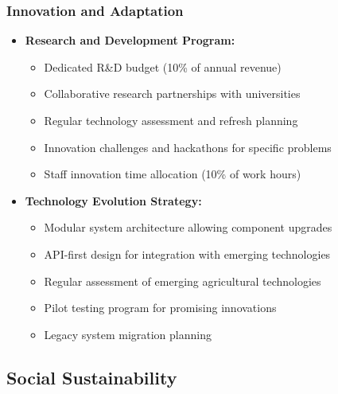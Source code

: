 \subsubsection{Innovation and Adaptation}
\begin{itemize}
    \item \textbf{Research and Development Program:}
    \begin{itemize}
        \item Dedicated R\&D budget (10\% of annual revenue)
        \item Collaborative research partnerships with universities
        \item Regular technology assessment and refresh planning
        \item Innovation challenges and hackathons for specific problems
        \item Staff innovation time allocation (10\% of work hours)
    \end{itemize}
    
    \item \textbf{Technology Evolution Strategy:}
    \begin{itemize}
        \item Modular system architecture allowing component upgrades
        \item API-first design for integration with emerging technologies
        \item Regular assessment of emerging agricultural technologies
        \item Pilot testing program for promising innovations
        \item Legacy system migration planning
    \end{itemize}
\end{itemize}

\subsection{Social Sustainability}

